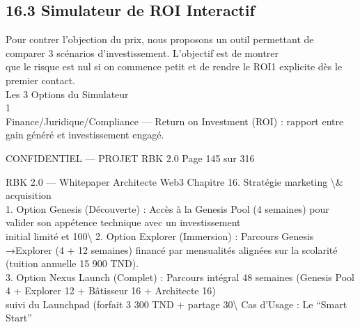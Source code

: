 \subsection{16.3 Simulateur de ROI Interactif}
Pour contrer l’objection du prix, nous proposons un outil permettant de comparer 3 scénarios d’investissement. L’objectif est de montrer\\
que le risque est nul si on commence petit et de rendre le ROI1 explicite dès le premier contact.\\
\vspace{0.5em}
Les 3 Options du Simulateur\\
1\\
Finance/Juridique/Compliance — Return on Investment (ROI) : rapport entre gain généré et investissement engagé.\\
\vspace{0.5em}
\vspace{0.5em}
\vspace{0.5em}
\begin{confidential}CONFIDENTIEL — PROJET RBK 2.0                                              Page 145 sur 316\end{confidential}
RBK 2.0 — Whitepaper Architecte Web3                                                              Chapitre 16. Stratégie marketing \textbackslash{}& acquisition\\
\vspace{0.5em}
\vspace{0.5em}
1. Option Genesis (Découverte) : Accès à la Genesis Pool (4 semaines) pour valider son appétence technique avec un investissement\\
initial limité et 100\textbackslash{}%
\vspace{0.5em}
2. Option Explorer (Immersion) : Parcours Genesis →Explorer (4 + 12 semaines) financé par mensualités alignées sur la scolarité\\
(tuition annuelle 15 900 TND).\\
\vspace{0.5em}
3. Option Nexus Launch (Complet) : Parcours intégral 48 semaines (Genesis Pool 4 + Explorer 12 + Bâtisseur 16 + Architecte 16)\\
suivi du Launchpad (forfait 3 300 TND + partage 30\textbackslash{}%
\vspace{0.5em}
Cas d’Usage : Le “Smart Start”\\
